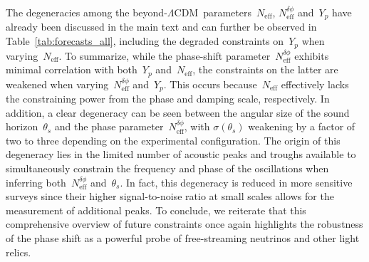 \documentclass[11pt]{article}
\numberwithin{equation}{section}
\newcommand{\Neff}{N_\mathrm{eff}}
\newcommand{\Nphase}{N_\mathrm{eff}^{\delta\phi}}
\begin{document}
The degeneracies among the beyond-$\Lambda$CDM~parameters~$\Neff$, $\Nphase$ and~$Y_p$ have already been discussed in the main text and can further be observed in Table~\ref{tab:forecasts_all}, including the degraded constraints on~$Y_p$ when varying~$\Neff$. To summarize, while the phase-shift parameter~$\Nphase$ exhibits minimal correlation with both~$Y_p$ and~$\Neff$, the constraints on the latter are weakened when varying~$\Nphase$ and~$Y_p$. This occurs because~$\Neff$ effectively lacks the constraining power from the phase and damping scale, respectively. In addition, a clear degeneracy can be seen between the angular size of the sound horizon~$\theta_s$ and the phase parameter~$\Nphase$, with $\sigma(\theta_s)$ weakening by a factor of two to three depending on the experimental configuration. The origin of this degeneracy lies in the limited number of acoustic peaks and troughs available to simultaneously constrain the frequency and phase of the oscillations when inferring both~$\Nphase$ and~$\theta_s$. In fact, this degeneracy is reduced in more sensitive surveys since their higher signal-to-noise ratio at small scales allows for the measurement of additional peaks. To conclude, we reiterate that this comprehensive overview of future constraints once again highlights the robustness of the phase shift as a powerful probe of free-streaming neutrinos and other light relics.



\clearpage
{}
{}


\end{document}
